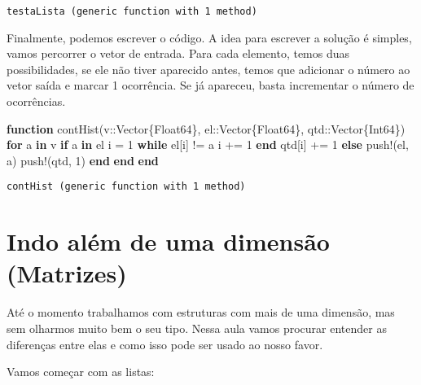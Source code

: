 \documentclass[
  letterpaper,
  DIV=11,
  numbers=noendperiod]{scrreprt}
\newenvironment{Shaded}{\begin{snugshade}}{\end{snugshade}}
\newcommand{\ControlFlowTok}[1]{\textcolor[rgb]{0.00,0.23,0.31}{\textbf{#1}}}
\newcommand{\DataTypeTok}[1]{\textcolor[rgb]{0.68,0.00,0.00}{#1}}
\newcommand{\FloatTok}[1]{\textcolor[rgb]{0.68,0.00,0.00}{#1}}
\newcommand{\FunctionTok}[1]{\textcolor[rgb]{0.28,0.35,0.67}{#1}}
\newcommand{\KeywordTok}[1]{\textcolor[rgb]{0.00,0.23,0.31}{\textbf{#1}}}
\newcommand{\NormalTok}[1]{\textcolor[rgb]{0.00,0.23,0.31}{#1}}
\newcommand{\OperatorTok}[1]{\textcolor[rgb]{0.37,0.37,0.37}{#1}}
\begin{document}
\begin{verbatim}
testaLista (generic function with 1 method)
\end{verbatim}

Finalmente, podemos escrever o código. A idea para escrever a solução é
simples, vamos percorrer o vetor de entrada. Para cada elemento, temos
duas possibilidades, se ele não tiver aparecido antes, temos que
adicionar o número ao vetor saída e marcar 1 ocorrência. Se já apareceu,
basta incrementar o número de ocorrências.

\begin{Shaded}
\begin{Highlighting}[]
\KeywordTok{function} \FunctionTok{contHist}\NormalTok{(v}\OperatorTok{::}\DataTypeTok{Vector\{Float64\}}\NormalTok{, el}\OperatorTok{::}\DataTypeTok{Vector\{Float64\}}\NormalTok{, qtd}\OperatorTok{::}\DataTypeTok{Vector\{Int64\}}\NormalTok{)}
    \ControlFlowTok{for}\NormalTok{ a }\KeywordTok{in}\NormalTok{ v}
        \ControlFlowTok{if}\NormalTok{ a }\KeywordTok{in}\NormalTok{ el}
\NormalTok{            i }\OperatorTok{=} \FloatTok{1}
            \ControlFlowTok{while}\NormalTok{ el[i] }\OperatorTok{!=}\NormalTok{ a}
\NormalTok{               i }\OperatorTok{+=} \FloatTok{1}
            \ControlFlowTok{end}
\NormalTok{            qtd[i] }\OperatorTok{+=} \FloatTok{1}
        \ControlFlowTok{else}
            \FunctionTok{push!}\NormalTok{(el, a)}
            \FunctionTok{push!}\NormalTok{(qtd, }\FloatTok{1}\NormalTok{)}
        \ControlFlowTok{end}
    \ControlFlowTok{end}
\KeywordTok{end}
\end{Highlighting}
\end{Shaded}

\begin{verbatim}
contHist (generic function with 1 method)
\end{verbatim}


\chapter{Indo além de uma dimensão
(Matrizes)}\label{indo-aluxe9m-de-uma-dimensuxe3o-matrizes}

Até o momento trabalhamos com estruturas com mais de uma dimensão, mas
sem olharmos muito bem o seu tipo. Nessa aula vamos procurar entender as
diferenças entre elas e como isso pode ser usado ao nosso favor.

Vamos começar com as listas:
\end{document}
